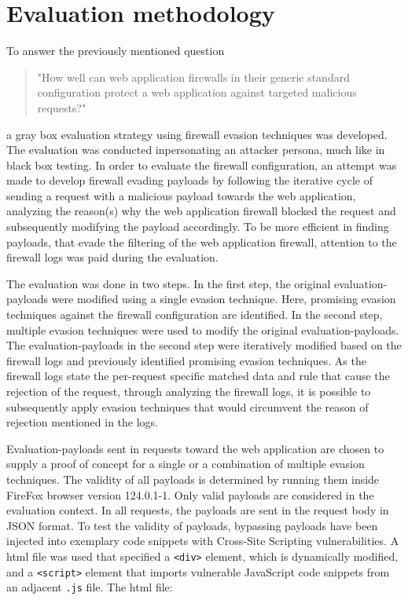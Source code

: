 \section{Evaluation methodology}
\label{sec:evaluation}
To answer the previously mentioned question
\begin{quote} "How well can web application firewalls in their generic standard configuration protect a web application against targeted malicious requests?"
\end{quote}
a gray box evaluation strategy using firewall evasion techniques was developed. The evaluation was conducted inpersonating an attacker persona, much like in black box testing.
In order to evaluate the firewall configuration, an attempt was made to develop firewall evading payloads by following the iterative cycle of sending a request with a malicious payload towards the web application, analyzing the reason(s) why the web application firewall blocked the request and subsequently modifying the payload accordingly. 
To be more efficient in finding payloads, that evade the filtering of the web application firewall, attention to the firewall logs was paid during the evaluation.

The evaluation was done in two steps. In the first step, the original evaluation-payloads were modified using a single evasion technique. Here, promising evasion techniques against the firewall configuration are identified.
In the second step, multiple evasion techniques were used to modify the original evaluation-payloads. 
The evaluation-payloads in the second step were iteratively modified based on the firewall logs and previously identified promising evasion techniques.
As the firewall logs state the per-request specific matched data and rule that cause the rejection of the request, through analyzing the firewall logs, it is possible to subsequently apply evasion techniques that would circumvent the reason of rejection mentioned in the logs.

Evaluation-payloads sent in requests toward the web application are chosen to supply a proof of concept for a single or a combination of multiple evasion techniques. The validity of all payloads is determined by running them inside FireFox browser version 124.0.1-1. Only valid payloads are considered in the evaluation context. %
In all requests, the payloads are sent in the request body in JSON format.
To test the validity of payloads, bypassing payloads have been injected into exemplary code snippets with Cross-Site Scripting vulnerabilities. A \acrshort{html} file was used that specified a \verb|<div>| element, which is dynamically modified, and a \verb|<script>| element that imports vulnerable JavaScript code snippets from an adjacent \verb|.js| file. The \acrshort{html} file:

